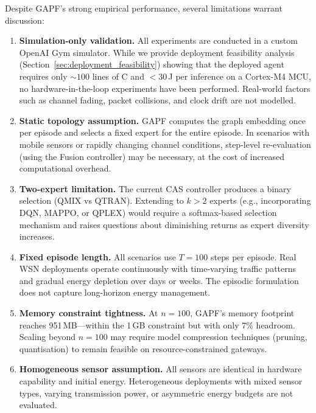 \documentclass[12pt, onecolumn, journal]{IEEEtran}
\begin{document}
Despite GAPF's strong empirical performance, several limitations warrant discussion:

\begin{enumerate}
    \item \textbf{Simulation-only validation.} All experiments are conducted in a custom OpenAI Gym simulator. While we provide deployment feasibility analysis (Section~\ref{sec:deployment_feasibility}) showing that the deployed agent requires only ${\sim}100$ lines of C and $<30$\,\textmu J per inference on a Cortex-M4 MCU, no hardware-in-the-loop experiments have been performed. Real-world factors such as channel fading, packet collisions, and clock drift are not modelled.
    
    \item \textbf{Static topology assumption.} GAPF computes the graph embedding once per episode and selects a fixed expert for the entire episode. In scenarios with mobile sensors or rapidly changing channel conditions, step-level re-evaluation (using the Fusion controller) may be necessary, at the cost of increased computational overhead.
    
    \item \textbf{Two-expert limitation.} The current CAS controller produces a binary selection (QMIX vs QTRAN). Extending to $k > 2$ experts (e.g., incorporating DQN, MAPPO, or QPLEX) would require a softmax-based selection mechanism and raises questions about diminishing returns as expert diversity increases.
    
    \item \textbf{Fixed episode length.} All scenarios use $T = 100$ steps per episode. Real WSN deployments operate continuously with time-varying traffic patterns and gradual energy depletion over days or weeks. The episodic formulation does not capture long-horizon energy management.
    
    \item \textbf{Memory constraint tightness.} At $n{=}100$, GAPF's memory footprint reaches 951\,MB---within the 1\,GB constraint but with only 7\% headroom. Scaling beyond $n{=}100$ may require model compression techniques (pruning, quantisation) to remain feasible on resource-constrained gateways.
    
    \item \textbf{Homogeneous sensor assumption.} All sensors are identical in hardware capability and initial energy. Heterogeneous deployments with mixed sensor types, varying transmission power, or asymmetric energy budgets are not evaluated.
\end{enumerate}
\end{document}
